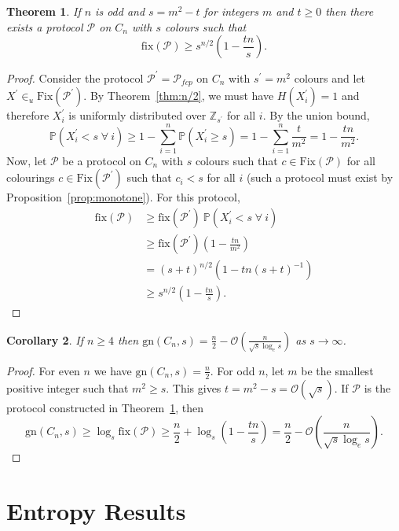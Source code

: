 \documentclass{birkjour}
\newtheorem{thm}{Theorem}[section]
\newtheorem{cor}[thm]{Corollary}
\theoremstyle{indenteddefinition}
\theoremstyle{indenteddefinition}
\numberwithin{equation}{section}
\renewcommand{\P}{\mathbb{P}}
\renewcommand{\Pr}{\mathcal{P}}
\newcommand{\Z}{\mathbb{Z}}
\renewcommand{\O}{\mathcal{O}}
\newcommand{\fix}{\mbox{fix}}
\newcommand{\gn}{\mbox{gn}}
\newcommand{\Fix}{\mbox{Fix}}
\begin{document}
\begin{thm}
\label{thm:round_up}
If $n$ is odd and $s = m^2-t$ for integers $m$ and $t \geq 0$ then there exists a protocol $\Pr$ on $C_n$ with $s$ colours such that 
	$$ \fix(\Pr) \geq s^{n/2} \left( 1 - \frac{tn}{s} \right). $$
\end{thm}
\begin{proof}
Consider the protocol $\Pr^\prime = \Pr_{fcp}$ on $C_n$ with $s^\prime = m^2$ colours and let $X^\prime \in_u \Fix(\Pr^\prime)$. By Theorem~\ref{thm:n/2}, we must have $H(X_i^\prime)=1$ and therefore $X_i^\prime$ is uniformly distributed over $\Z_{s^\prime}$ for all $i$. By the union bound, 
	$$ \P\left( X_i^\prime<s \; \forall \: i \right) \geq 1 - \sum_{i=1}^n \P(X_i^\prime \geq s) = 1 - \sum_{i=1}^n \frac{t}{m^2} = 1 - \frac{tn}{m^2}. $$
Now, let $\Pr$ be a protocol on $C_n$ with $s$ colours such that $c \in \Fix(\Pr)$ for all colourings $c \in \Fix(\Pr^\prime)$ such that $c_i < s$ for all $i$ (such a protocol must exist by Proposition~\ref{prop:monotone}). For this protocol,  
	\begin{align*} \fix(\Pr) 
	& \geq \fix(\Pr^\prime) \: \P\left( X_i^\prime<s \; \forall \: i \right) \\
	& \geq \fix(\Pr^\prime) \left( 1 - \frac{tn}{m^2} \right) \\
	& = (s+t)^{n/2} \left( 1 - tn(s+t)^{-1} \right) \\ 
	& \geq s^{n/2} \left( 1 - \frac{tn}{s} \right).
	\end{align*}
\end{proof}
\begin{cor}
If $n \geq 4$ then $\gn(C_n,s) = \frac{n}{2} - \O\left(\frac{n}{\sqrt{s}\log_es} \right)$ as $s \rightarrow \infty$.
\end{cor}
\begin{proof}
For even $n$ we have $\gn(C_n,s) = \frac{n}{2}$. For odd $n$, let $m$ be the smallest positive integer such that $m^2 \geq s$. This gives $t = m^2-s = \O(\sqrt{s})$. If $\Pr$ is the protocol constructed in Theorem~\ref{thm:round_up}, then 
	$$ \gn(C_n,s) \geq \log_s\fix(\Pr) \geq \frac{n}{2} + \log_s \left( 1 - \frac{tn}{s} \right) = \frac{n}{2} - \O\left( \frac{n}{\sqrt{s}\log_es} \right). $$
\end{proof}








\section{Entropy Results}
\label{sec:entropy}
\end{document}
